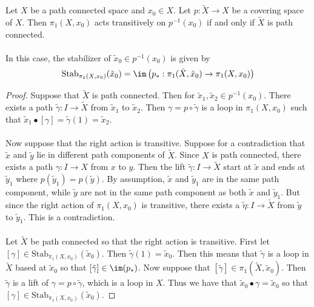 \documentclass[a4paper]{article}
\begin{document}
\begin{prp}{}{} Let $X$ be a path connected space and $x_0\in X$. Let $p:\tilde{X}\to X$ be a covering space of $X$. Then $\pi_1(X,x_0)$ acts transitively on $p^{-1}(x_0)$ if and only if $\tilde{X}$ is path connected. \\~\\

In this case, the stabilizer of $\tilde{x}_0\in p^{-1}(x_0)$ is given by $$\text{Stab}_{\pi_1(X,x_0)}(\tilde{x}_0)=\im\left(p_\ast:\pi_1(\tilde{X},\tilde{x}_0)\to\pi_1(X,x_0)\right)$$ \tcbline
\begin{proof}
Suppose that $\tilde{X}$ is path connected. Then for $\tilde{x}_1,\tilde{x}_2\in p^{-1}(x_0)$. There exists a path $\tilde{\gamma}:I\to\tilde{X}$ from $\tilde{x}_1$ to $\tilde{x}_2$. Then $\gamma=p\circ\tilde{\gamma}$ is a loop in $\pi_1(X,x_0)$ such that $\tilde{x}_1\bullet[\gamma]=\tilde{\gamma}(1)=\tilde{x}_2$. \\~\\

Now suppose that the right action is transitive. Suppose for a contradiction that $\tilde{x}$ and $\tilde{y}$ lie in different path components of $\tilde{X}$. Since $X$ is path connected, there exists a path $\gamma:I\to X$ from $x$ to $y$. Then the lift $\tilde{\gamma}:I\to\tilde{X}$ start at $\tilde{x}$ and ends at $\tilde{y}_1$ where $p(\tilde{y}_1)=p(\tilde{y})$. By assumption, $\tilde{x}$ and $\tilde{y}_1$ are in the same path component, while $\tilde{y}$ are not in the same path component as both $\tilde{x}$ and $\tilde{y}_1$. But since the right action of $\pi_1(X,x_0)$ is transitive, there exists a $\tilde{\eta}:I\to\tilde{X}$ from $\tilde{y}$ to $\tilde{y}_1$. This is a contradiction. \\~\\

Let $\tilde{X}$ be path connected so that the right action is transitive. First let $[\gamma]\in\text{Stab}_{\pi_1(X,x_0)}(\tilde{x}_0)$. Then $\tilde{\gamma}(1)=\tilde{x}_0$. Then this means that $\tilde{\gamma}$ is a loop in $\tilde{X}$ based at $\tilde{x}_0$ so that $[\tilde{\gamma}]\in\im(p_\ast)$. Now suppose that $[\tilde{\gamma}]\in\pi_1(\tilde{X},\tilde{x}_0)$. Then $\tilde{\gamma}$ is a lift of $\gamma=p\circ\tilde{\gamma}$, which is a loop in $X$. Thus we have that $\tilde{x}_0\bullet\gamma=\tilde{x}_0$ so that $[\gamma]\in\text{Stab}_{\pi_1(X,x_0)}(\tilde{x}_0)$. 
\end{proof}
\end{prp}
\end{document}
